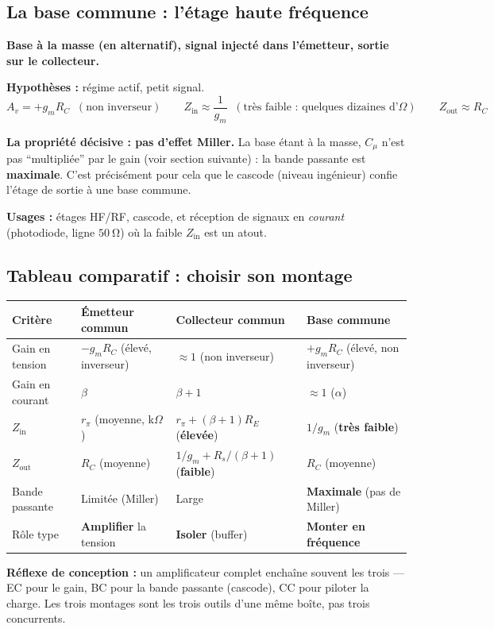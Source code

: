 \documentclass[12pt,a4paper,twoside]{book}
\begin{document}
\subsection{La base commune : l'étage haute fréquence}

\begin{formule}
\textbf{Base à la masse (en alternatif), signal injecté dans l'émetteur, sortie sur le collecteur.}

\textbf{Hypothèses :} régime actif, petit signal.
\[
A_v = +g_m R_C \;\; (\text{non inverseur}) \qquad Z_{\text{in}} \approx \frac{1}{g_m} \;\; (\text{très faible : quelques dizaines d'}\Omega) \qquad Z_{\text{out}} \approx R_C
\]

\textbf{La propriété décisive : pas d'effet Miller.} La base étant à la masse, $C_\mu$ n'est pas ``multipliée'' par le gain (voir section suivante) : la bande passante est \textbf{maximale}. C'est précisément pour cela que le cascode (niveau ingénieur) confie l'étage de sortie à une base commune.

\textbf{Usages :} étages HF/RF, cascode, et réception de signaux en \textit{courant} (photodiode, ligne $\SI{50}{\ohm}$) où la faible $Z_{\text{in}}$ est un atout.
\end{formule}

\subsection{Tableau comparatif : choisir son montage}

\begin{pratique}
\begin{center}
\renewcommand{\arraystretch}{1.45}
\begin{tabular}{p{2.9cm}p{3.1cm}p{3.1cm}p{3.3cm}}
\toprule
\textbf{Critère} & \textbf{Émetteur commun} & \textbf{Collecteur commun} & \textbf{Base commune} \\
\midrule
Gain en tension & $-g_m R_C$ (élevé, inverseur) & $\approx 1$ (non inverseur) & $+g_m R_C$ (élevé, non inverseur) \\
Gain en courant & $\beta$ & $\beta + 1$ & $\approx 1$ ($\alpha$) \\
$Z_{\text{in}}$ & $r_\pi$ (moyenne, k$\Omega$) & $r_\pi + (\beta{+}1)R_E$ (\textbf{élevée}) & $1/g_m$ (\textbf{très faible}) \\
$Z_{\text{out}}$ & $R_C$ (moyenne) & $1/g_m + R_s/(\beta{+}1)$ (\textbf{faible}) & $R_C$ (moyenne) \\
Bande passante & Limitée (Miller) & Large & \textbf{Maximale} (pas de Miller) \\
Rôle type & \textbf{Amplifier} la tension & \textbf{Isoler} (buffer) & \textbf{Monter en fréquence} \\
\bottomrule
\end{tabular}
\end{center}

\textbf{Réflexe de conception :} un amplificateur complet enchaîne souvent les trois --- EC pour le gain, BC pour la bande passante (cascode), CC pour piloter la charge. Les trois montages sont les trois outils d'une même boîte, pas trois concurrents.
\end{pratique}
\end{document}
